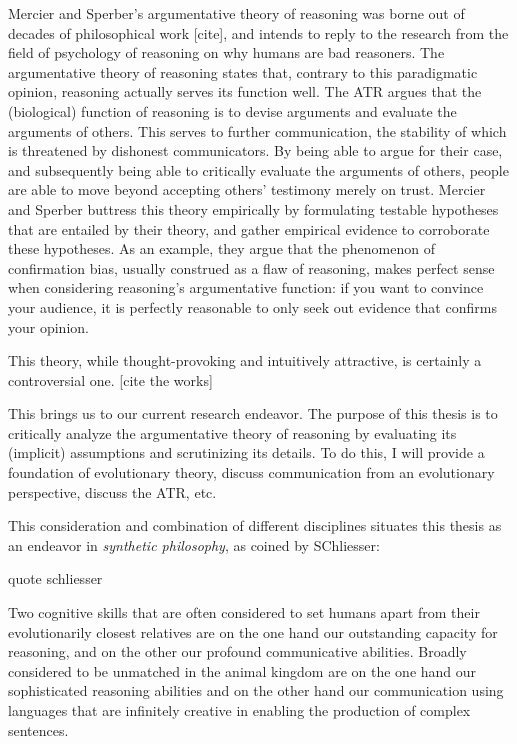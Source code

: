 Mercier and Sperber's argumentative theory of reasoning was borne out of decades of philosophical work [cite], and intends to reply to the research from the field of psychology of reasoning on why humans are bad reasoners.
The argumentative theory of reasoning states that, contrary to this paradigmatic opinion, reasoning actually serves its function well. The ATR argues that the (biological) function of reasoning is to devise arguments and evaluate the arguments of others. This serves to further communication, the stability of which is threatened by dishonest communicators. By being able to argue for their case, and subsequently being able to critically evaluate the arguments of others, people are able to move beyond accepting others' testimony merely on trust.
Mercier and Sperber buttress this theory empirically by formulating testable hypotheses that are entailed by their theory, and gather empirical evidence to corroborate these hypotheses. As an example, they argue that the phenomenon of confirmation bias, usually construed as a flaw of reasoning, makes perfect sense when considering reasoning's argumentative function: if you want to convince your audience, it is perfectly reasonable to only seek out evidence that confirms your opinion.

This theory, while thought-provoking and intuitively attractive, is certainly a controversial one. [cite the works]

This brings us to our current research endeavor.
The purpose of this thesis is to critically analyze the argumentative theory of reasoning by evaluating its (implicit) assumptions and scrutinizing its details.
To do this, I will provide a foundation of evolutionary theory, discuss communication from an evolutionary perspective, discuss the ATR, etc.

This consideration and combination of different disciplines situates this thesis as an endeavor in \emph{synthetic philosophy}, as coined by SChliesser:
\begin{quoting}
    quote schliesser
\end{quoting}

Two cognitive skills that are often considered
to set humans apart from their evolutionarily closest relatives are on the one hand our outstanding capacity for reasoning, and on the other our profound communicative abilities.
Broadly considered to be unmatched in the animal kingdom \citep{CheneySeyfarth98} are on the one hand
our sophisticated reasoning abilities
and
on the other hand
our communication using languages that are infinitely creative in enabling the production of complex sentences.

